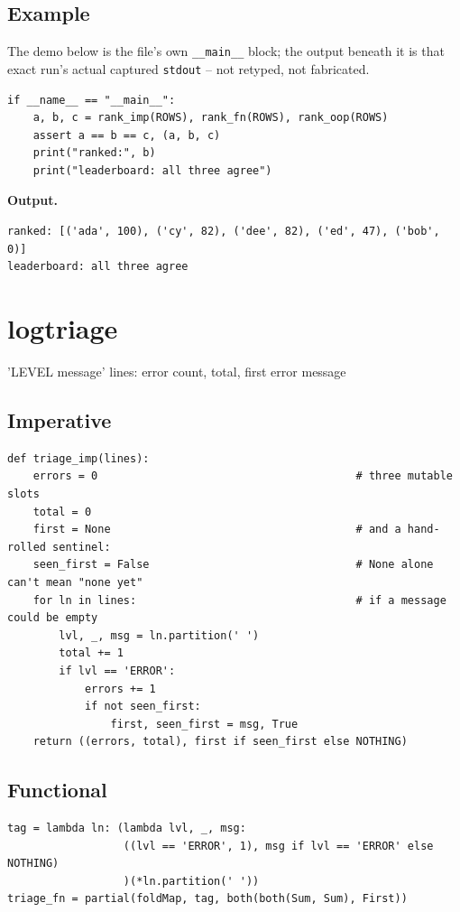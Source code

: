 \documentclass[10pt,letterpaper]{book}
\begin{document}
\section*{Example}
The demo below is the file's own \texttt{\_\_main\_\_} block; the output beneath it is that exact run's actual captured \texttt{stdout} -- not retyped, not fabricated.
\begin{lstlisting}[style=code]
if __name__ == "__main__":
    a, b, c = rank_imp(ROWS), rank_fn(ROWS), rank_oop(ROWS)
    assert a == b == c, (a, b, c)
    print("ranked:", b)
    print("leaderboard: all three agree")
\end{lstlisting}
\noindent\textbf{Output.}
\begin{lstlisting}[style=ex]
ranked: [('ada', 100), ('cy', 82), ('dee', 82), ('ed', 47), ('bob', 0)]
leaderboard: all three agree
\end{lstlisting}
\chapter{logtriage}
'LEVEL message' lines: error count, total, first error message

\section*{Imperative}
\begin{lstlisting}[style=code]
def triage_imp(lines):
    errors = 0                                        # three mutable slots
    total = 0
    first = None                                      # and a hand-rolled sentinel:
    seen_first = False                                # None alone can't mean "none yet"
    for ln in lines:                                  # if a message could be empty
        lvl, _, msg = ln.partition(' ')
        total += 1
        if lvl == 'ERROR':
            errors += 1
            if not seen_first:
                first, seen_first = msg, True
    return ((errors, total), first if seen_first else NOTHING)
\end{lstlisting}
\section*{Functional}
\begin{lstlisting}[style=code]
tag = lambda ln: (lambda lvl, _, msg:
                  ((lvl == 'ERROR', 1), msg if lvl == 'ERROR' else NOTHING)
                  )(*ln.partition(' '))
triage_fn = partial(foldMap, tag, both(both(Sum, Sum), First))
\end{lstlisting}
\end{document}
